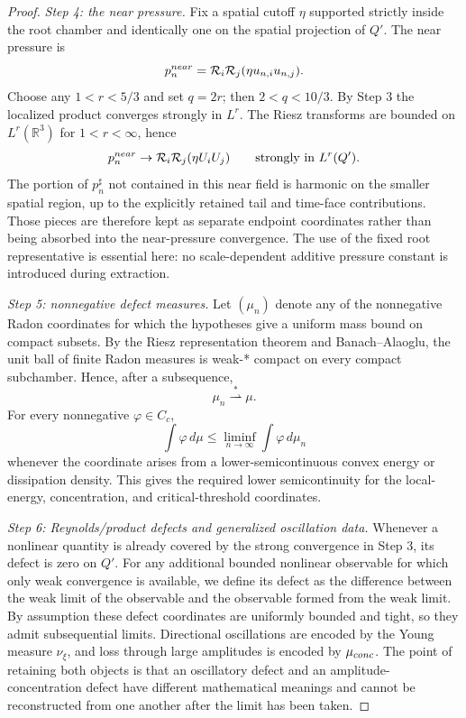 \documentclass[10pt,a4paper]{amsart}
\newcommand{\R}{\mathbb R}
\begin{document}
\begin{proof}
\emph{Step 4: the near pressure.}
Fix a spatial cutoff \(\eta\) supported strictly inside the root chamber and
identically one on the spatial projection of \(Q'\).  The near pressure is
\[
 p_n^{\rm near}=\mathcal R_i\mathcal R_j(\eta u_{n,i}u_{n,j}).
\]
Choose any \(1<r<5/3\) and set \(q=2r\); then \(2<q<10/3\).  By Step 3 the
localized product converges strongly in \(L^r\).  The Riesz transforms are
bounded on \(L^r(\R^3)\) for \(1<r<\infty\), hence
\[
 p_n^{\rm near}\to
 \mathcal R_i\mathcal R_j(\eta U_iU_j)
 \qquad\hbox{strongly in }L^r(Q').
\]
The portion of \(p_n^\sharp\) not contained in this near field is harmonic on
the smaller spatial region, up to the explicitly retained tail and time-face
contributions.  Those pieces are therefore kept as separate endpoint
coordinates rather than being absorbed into the near-pressure convergence.
The use of the fixed root representative is essential here: no scale-dependent
additive pressure constant is introduced during extraction.

\emph{Step 5: nonnegative defect measures.}
Let \((\mu_n)\) denote any of the nonnegative Radon coordinates for which the
hypotheses give a uniform mass bound on compact subsets.  By the Riesz
representation theorem and Banach--Alaoglu, the unit ball of finite Radon
measures is weak-* compact on every compact subchamber.  Hence, after a
subsequence,
\[
 \mu_n\stackrel{*}{\rightharpoonup}\mu.
\]
For every nonnegative \(\varphi\in C_c\),
\[
 \int\varphi\,d\mu
 \le \liminf_{n\to\infty}\int\varphi\,d\mu_n
\]
whenever the coordinate arises from a lower-semicontinuous convex energy or
dissipation density.  This gives the required lower semicontinuity for the
local-energy, concentration, and critical-threshold coordinates.

\emph{Step 6: Reynolds/product defects and generalized oscillation data.}
Whenever a nonlinear quantity is already covered by the strong convergence in
Step 3, its defect is zero on \(Q'\).  For any additional bounded nonlinear
observable for which only weak convergence is available, we define its defect
as the difference between the weak limit of the observable and the observable
formed from the weak limit.  By assumption these defect coordinates are
uniformly bounded and tight, so they admit subsequential limits.  Directional
oscillations are encoded by the Young measure \(\nu_\xi\), and loss through
large amplitudes is encoded by \(\mu_{\rm conc}\).  The point of retaining both
objects is that an oscillatory defect and an amplitude-concentration defect
have different mathematical meanings and cannot be reconstructed from one
another after the limit has been taken.


\end{proof}
\end{document}
